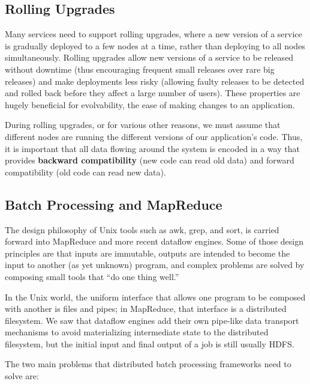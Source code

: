 \documentclass{article}
\begin{document}
    \subsection{Rolling Upgrades}
    Many services need to support rolling upgrades, where a new version of a service is gradually deployed to a few nodes at a time, rather than deploying to all nodes simultaneously. Rolling upgrades allow new versions of a service to be released without downtime (thus encouraging frequent small releases over rare big releases) and make deployments less risky (allowing faulty releases to be detected and rolled back before they affect a large number of users). These properties are hugely beneficial for evolvability, the ease of making changes to an application.
    
    During rolling upgrades, or for various other reasons, we must assume that different nodes are running the different versions of our application’s code. Thus, it is important that all data flowing around the system is encoded in a way that provides \textbf{backward compatibility} (new code can read old data) and forward compatibility (old code can read new data).
    
    \subsection{Batch Processing and MapReduce}
     The design philosophy of Unix tools such as awk, grep, and sort, is carried forward into MapReduce and more recent dataflow engines. Some of those design principles are that inputs are immutable, outputs are intended to become the input to another (as yet unknown) program, and complex problems are solved by composing small tools that ``do one thing well.”
     
     In the Unix world, the uniform interface that allows one program to be composed with another is files and pipes; in MapReduce, that interface is a distributed filesystem. We saw that dataflow engines add their own pipe-like data transport mechanisms to avoid materializing intermediate state to the distributed filesystem, but the initial input and final output of a job is still usually HDFS.
     
    The two main problems that distributed batch processing frameworks need to solve are:
    
\end{document}
